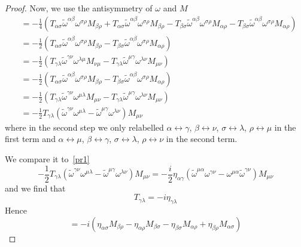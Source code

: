 \begin{proof}
        Now, we use the antisymmetry of $\omega$ and $M$
        \begin{equation*}
        \begin{aligned}
            & = - \frac{1}{4} (T_{\alpha\sigma} \tilde \omega^{\alpha \beta} \omega^{\sigma \rho} M_{\beta\rho} + T_{\alpha\sigma} \tilde \omega^{\alpha \beta} \omega^{\sigma \rho} M_{\beta\rho} - T_{\beta\sigma} \tilde \omega^{\alpha \beta} \omega^{\sigma \rho} M_{\alpha\rho} - T_{\beta\sigma} \tilde \omega^{\alpha \beta} \omega^{\sigma \rho} M_{\alpha\rho }) \\ & = - \frac{1}{2} (T_{\alpha\sigma} \tilde \omega^{\alpha \beta} \omega^{\sigma \rho} M_{\beta\rho} - T_{\beta\sigma} \tilde \omega^{\alpha \beta} \omega^{\sigma \rho} M_{\alpha\rho}) \\ & = - \frac{1}{2} (T_{\gamma\lambda} \tilde \omega^{\gamma \nu} \omega^{\lambda \mu} M_{\nu\mu} - T_{\gamma\lambda} \tilde \omega^{\mu \gamma} \omega^{\lambda \nu} M_{\mu \nu}) \\ & = - \frac{1}{2} (T_{\alpha\sigma} \tilde \omega^{\alpha \beta} \omega^{\sigma \rho} M_{\beta\rho} - T_{\beta\sigma} \tilde \omega^{\alpha \beta} \omega^{\sigma \rho} M_{\alpha\rho}) \\ & = - \frac{1}{2} (T_{\gamma\lambda} \tilde \omega^{\gamma\nu} \omega^{\mu\lambda} M_{\mu\nu} - T_{\gamma\lambda} \tilde \omega^{\mu \gamma} \omega^{\lambda \nu} M_{\mu \nu}) \\ & = - \frac{1}{2} T_{\gamma\lambda} (\tilde \omega^{\gamma\nu} \omega^{\mu\lambda} - \tilde \omega^{\mu \gamma} \omega^{\lambda \nu}) M_{\mu \nu}
        \end{aligned}
        \end{equation*}
        where in the second step we only relabelled $\alpha \leftrightarrow \gamma$, $\beta \leftrightarrow \nu$, $\sigma \leftrightarrow \lambda$, $\rho \leftrightarrow \mu$ in the first term and $\alpha \leftrightarrow \mu$, $\beta \leftrightarrow \gamma$, $\sigma \leftrightarrow \lambda$, $\rho \leftrightarrow \nu$ in the second term. 

        We compare it to~\eqref{pr1}
        \begin{equation*}
            - \frac{1}{2} T_{\gamma\lambda} (\tilde \omega^{\gamma\nu} \omega^{\mu\lambda} - \tilde \omega^{\mu \gamma} \omega^{\lambda \nu}) M_{\mu \nu} = - \frac{i}{2} \eta_{\alpha \gamma} (\tilde \omega^{\mu\alpha} \omega^{\gamma \nu} -\omega^{\mu\alpha} \tilde \omega^{\gamma\nu}) M_{\mu\nu}
        \end{equation*}
        and we find that 
        \begin{equation*}
            T_{\gamma \lambda} = - i \eta_{\gamma\lambda}
        \end{equation*}
        Hence
        \begin{equation*}
            [M_{\alpha\beta}, M_{\sigma\rho}] = -i (\eta_{\alpha\sigma} M_{\beta\rho} - \eta_{\alpha\rho} M_{\beta\sigma} - \eta_{\beta\sigma} M_{\alpha\rho} + \eta_{\beta\rho} M_{\alpha\sigma})
        \end{equation*}
    \end{proof}

